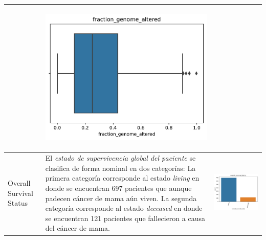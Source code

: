 \begin{table}[!htb]
\begin{threeparttable}
\begin{tabular}{p{2.5cm} p{7cm} p{6.5cm}}
			& \begin{center}\includegraphics[width=1\linewidth]{NOTEBOOK/IMAGENES_DESCRIPTIVAS/17_fraction_genome_altered}\end{center}
			\\ \hline
			
			Overall Survival Status
			& El \textit{estado de supervivencia global del paciente} se clasifica de forma nominal en dos categorías: La primera categoría corresponde al estado \textit{living} en donde se encuentran 697 pacientes que aunque padecen cáncer de mama aún viven. La segunda categoría corresponde al estado \textit{deceased} en donde se encuentran 121 pacientes que fallecieron a causa del cáncer de mama. 
			& \begin{center}\includegraphics[width=1\linewidth]{NOTEBOOK/IMAGENES_DESCRIPTIVAS/40_overall_survival_status}\end{center}
			\\ \hline
		\end{tabular}
	\end{threeparttable}
\end{table}

